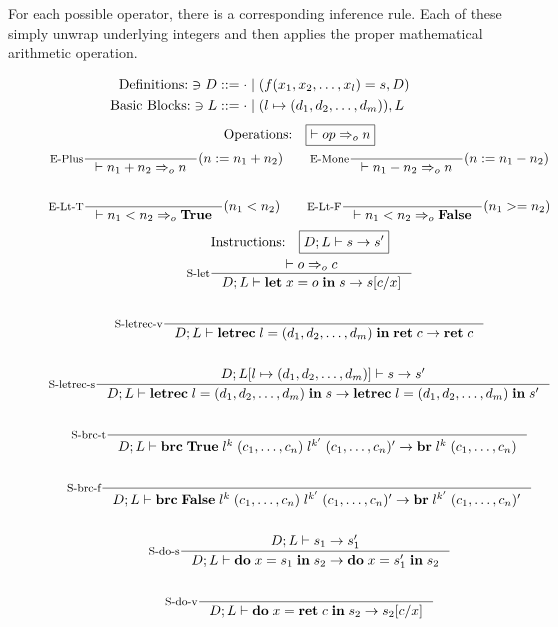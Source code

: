 \documentclass[a4paper, oneside, 10pt, draft]{memoir}
\begin{document}
For each possible operator, there is a corresponding inference
rule. Each of these simply unwrap underlying integers and then applies
the proper mathematical arithmetic operation.
\newcommand{\meval}{:=}
\begin{figure}
  \begin{align*}
    \text{Definitions:} \ni D & ::= \cdot \; \vert \; (f(x_1, x_2, \dotsc,
    x_l) = s, D)\\
    \text{Basic Blocks:} \ni L & ::= \cdot \; \vert \; (l \mapsto (d_1, d_2, \dotsc, d_m)),L
  \end{align*}
  \begin{gather*}
    \text{Operations:} \quad \boxed{|- op \eop n}\\
    \inference[E-Plus]{}{|- n_1 + n_2 \eop n}(n \meval n_1 + n_2)
    \quad \quad
    \inference[E-Mone]{}{|- n_1 - n_2 \eop n}(n \meval n_1 - n_2)\\\\
    \inference[E-Lt-T]{}{|- n_1  < n_2 \eop \btrue}(n_1 < n_2) \quad \quad
    \inference[E-Lt-F]{}{|- n_1  < n_2 \eop \bfalse}(n_1 >= n_2)
  \end{gather*}
  \begin{gather*}
    \text{Instructions:} \quad \boxed{D;L |- s -> s'}\\
    \inference[S-let]{|- o \eop c}{D;L |- \ilet{x}{o}{s} -> s[c/x]}\\\\
    \inference[S-letrec-v]{}{D;L |- \iletrec{l}{\dbundle}
      {\iret{c}} -> \iret{c}}\\\\
    \inference[S-letrec-s]{D;L[l \mapsto \dbundle] |- s -> s'}
    {D;L |- \iletrec{l}{\dbundle}{s} -> \iletrec{l}{\dbundle}{s'}}\\\\
    \inference[S-brc-t]{}{D;L |-
      \ibrc{\btrue}{l^k}{(c_1, \dotsc, c_n)}{l^{k'}}{(c_1, \dotsc, c_n)'} -> \ibr{l^k}{(c_1, \dotsc, c_n)}}\\\\
    \inference[S-brc-f]{}{D;L |-
      \ibrc{\bfalse}{l^k}{(c_1, \dotsc, c_n)}{l^{k'}}{(c_1, \dotsc, c_n)'} ->
      \ibr{l^{k'}}{(c_1, \dotsc, c_n)'}}\\\\
    \inference[S-do-s]{D;L |- s_1 -> s'_1}{D;L |-
      \ido{x}{s_1}{s_2} -> \ido{x}{s'_1}{s_2}}\\\\
    \inference[S-do-v]{}{D;L |- \ido{x}{\iret{c}}{s_2} -> s_2[c/x]}\\\\

\end{gather*}
\end{figure}
\end{document}
